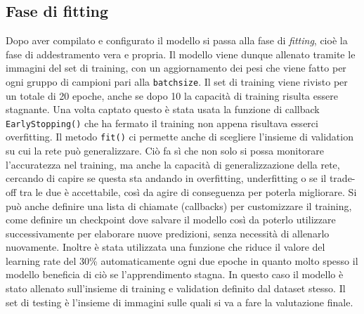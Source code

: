      
\subsection{Fase di fitting}
Dopo aver compilato e configurato il modello si passa alla fase di \emph{fitting}, cioè la fase di addestramento
 vera e propria. Il modello viene dunque allenato tramite le immagini del set di training, con un aggiornamento
  dei pesi che viene fatto per ogni gruppo di campioni pari alla \lstinline{batchsize}. Il set di training viene rivisto
   per un totale di 20 epoche, anche se dopo 10 la capacità di training risulta essere stagnante.
    Una volta captato questo è stata usata la funzione di callback \lstinline{EarlyStopping()} che ha fermato il
     training non appena risultava esserci overfitting. 
   Il metodo  \lstinline{fit()} ci permette anche di scegliere l’insieme di validation su cui la rete 
   può generalizzare. Ciò fa sì che non solo si possa monitorare l'accuratezza nel training, ma anche la
    capacità di generalizzazione della rete, cercando di capire se questa sta andando in overfitting, 
    underfitting o se il trade-off tra le due è accettabile, così da agire di conseguenza 
    per poterla migliorare. Si può anche definire una lista di chiamate (callbacks) per 
    customizzare il training, come definire un checkpoint dove salvare il modello così 
    da poterlo utilizzare successivamente per elaborare nuove predizioni,
     senza necessità di allenarlo nuovamente.  Inoltre è stata utilizzata una funzione che riduce il 
     valore del learning rate del 30\% automaticamente ogni due epoche in quanto molto spesso 
     il modello beneficia di ciò se l’apprendimento stagna. 
In questo caso il modello è stato allenato sull’insieme di training e validation definito dal dataset stesso.
 Il set di testing è l’insieme di immagini sulle quali si va a fare la valutazione finale.
